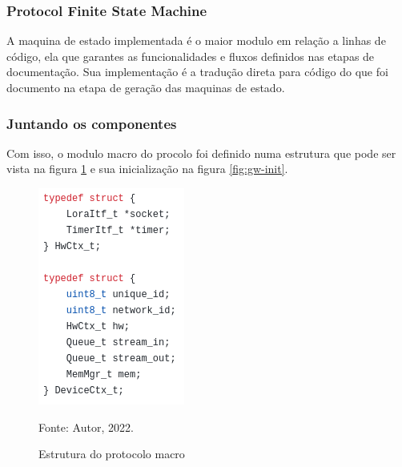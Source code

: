 \subsubsection{Protocol Finite State Machine}

A maquina de estado implementada é o maior modulo em relação a linhas de código, ela que
garantes as funcionalidades e fluxos definidos nas etapas de documentação. Sua implementação
é a tradução direta para código do que foi documento na etapa de geração das maquinas de estado.

\subsubsection{Juntando os componentes}

Com isso, o modulo macro do procolo foi definido numa estrutura que pode ser vista na figura \ref{fig:dev}
e sua inicialização na figura \ref{fig:gw-init}.

\begin{figure}[H]
    \centering
	\caption{Estrutura do protocolo macro}
    \includegraphics[height=0.2\textheight,keepaspectratio]{img/dev.png}
    \label{fig:dev}
    
    Fonte: Autor, 2022.
\end{figure}

